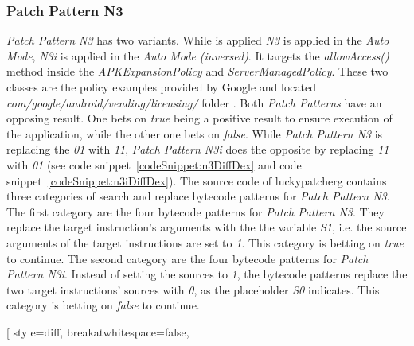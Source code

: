 \subsubsection{Patch Pattern N3}
\textit{Patch Pattern N3} has two variants. While is applied \textit{N3} is applied in the \textit{Auto Mode}, \textit{N3i} is applied in the \textit{Auto Mode (inversed)}.
It targets the \textit{allowAccess()} method inside the \textit{APKExpansionPolicy} and \textit{ServerManagedPolicy}.
These two classes are the policy examples provided by Google and located \textit{com/google/android/vending/licensing/} folder \cite{developersLicensingReference}.
\newline
Both \textit{Patch Patterns} have an opposing result.
One bets on \textit{true} being a positive result to ensure execution of the application, while the other one bets on \textit{false}.
While \textit{Patch Pattern N3} is replacing the \textit{01} with \textit{11}, \textit{Patch Pattern N3i} does the opposite by replacing \textit{11} with \textit{01} (see code snippet~\ref{codeSnippet:n3DiffDex} and code snippet~\ref{codeSnippet:n3iDiffDex}).
\newline
The source code of \gls{luckypatcherg} contains three categories of search and replace bytecode patterns for \textit{Patch Pattern N3}.
The first category are the four bytecode patterns for \textit{Patch Pattern N3}.
They replace the target instruction's arguments with the the variable \textit{S1}, i.e. the source arguments of the target instructions are set to \textit{1}.
This category is betting on \textit{true} to continue.
\newline
The second category are the four bytecode patterns for \textit{Patch Pattern N3i}.
Instead of setting the sources to \textit{1}, the bytecode patterns replace the two target instructions' sources with \textit{0}, as the placeholder \textit{S0} indicates.
This category is betting on \textit{false} to continue.
\newpage


[
 style=diff,
 breakatwhitespace=false,
